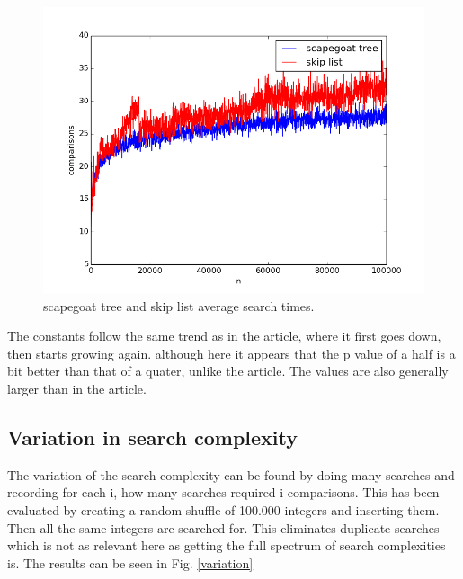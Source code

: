 \documentclass[12pt, a4paper]{article}
\begin{document}
\begin{figure}[H]
    \centering
    \includegraphics[width=1\textwidth]{averagesearch.png}
    \caption{scapegoat tree and skip list average search times.}
    \label{avgsearch}
\end{figure}


\medskip


The constants follow the same trend as in the article, where it first goes down, then starts growing again. although here it appears that the 
p value of a half is a bit better than that of a quater, unlike the article. The values are also generally larger than in the article.


\subsection*{Variation in search complexity}
The variation of the search complexity can be found by doing many searches and recording for each i, how many searches required i comparisons.
This has been evaluated by creating a random shuffle of 100.000 integers and inserting them. Then all the same integers are searched for.
This eliminates duplicate searches which is not as relevant here as getting the full spectrum of search complexities is. The results 
can be seen in Fig. \ref{variation}
\end{document}
